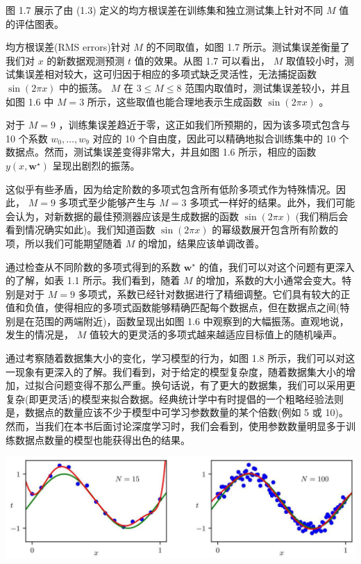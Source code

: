 \documentclass[10pt]{report}
\begin{document}
图 1.7 展示了由 (1.3) 定义的均方根误差在训练集和独立测试集上针对不同 \(M\) 值的评估图表。

均方根误差(RMS errors)针对 \(M\) 的不同取值，如图 1.7 所示。测试集误差衡量了我们对 \(x\) 的新数据观测预测 \(t\) 值的效果。从图 1.7 可以看出， \(M\) 取值较小时，测试集误差相对较大，这可归因于相应的多项式缺乏灵活性，无法捕捉函数 \(\sin \left( {2\pi x}\right)\) 中的振荡。 \(M\) 在 \(3 \leq  M \leq  8\) 范围内取值时，测试集误差较小，并且如图 1.6 中 \(M = 3\) 所示，这些取值也能合理地表示生成函数 \(\sin \left( {2\pi x}\right)\) 。

对于 \(M = 9\) ，训练集误差趋近于零，这正如我们所预期的，因为该多项式包含与 10 个系数 \({w}_{0},\ldots ,{w}_{9}\) 对应的 10 个自由度，因此可以精确地拟合训练集中的 10 个数据点。然而，测试集误差变得非常大，并且如图 1.6 所示，相应的函数 \(y\left( {x,{\mathbf{w}}^{ \star  }}\right)\) 呈现出剧烈的振荡。

这似乎有些矛盾，因为给定阶数的多项式包含所有低阶多项式作为特殊情况。因此， \(M = 9\) 多项式至少能够产生与 \(M = 3\) 多项式一样好的结果。此外，我们可能会认为，对新数据的最佳预测器应该是生成数据的函数 \(\sin \left( {2\pi x}\right)\) (我们稍后会看到情况确实如此)。我们知道函数 \(\sin \left( {2\pi x}\right)\) 的幂级数展开包含所有阶数的项，所以我们可能期望随着 \(M\) 的增加，结果应该单调改善。

通过检查从不同阶数的多项式得到的系数 \({\mathbf{w}}^{ \star  }\) 的值，我们可以对这个问题有更深入的了解，如表 1.1 所示。我们看到，随着 \(M\) 的增加，系数的大小通常会变大。特别是对于 \(M = 9\) 多项式，系数已经针对数据进行了精细调整。它们具有较大的正值和负值，使得相应的多项式函数能够精确匹配每个数据点，但在数据点之间(特别是在范围的两端附近)，函数呈现出如图 1.6 中观察到的大幅振荡。直观地说，发生的情况是， \(M\) 值较大的更灵活的多项式越来越适应目标值上的随机噪声。

通过考察随着数据集大小的变化，学习模型的行为，如图 1.8 所示，我们可以对这一现象有更深入的了解。我们看到，对于给定的模型复杂度，随着数据集大小的增加，过拟合问题变得不那么严重。换句话说，有了更大的数据集，我们可以采用更复杂(即更灵活)的模型来拟合数据。经典统计学中有时提倡的一个粗略经验法则是，数据点的数量应该不少于模型中可学习参数数量的某个倍数(例如 5 或 10)。然而，当我们在本书后面讨论深度学习时，我们会看到，使用参数数量明显多于训练数据点数量的模型也能获得出色的结果。

\begin{center}
\includegraphics[max width=1.0\textwidth]{images/0194e279-9b28-703a-88f4-c3ac21e2010d_31_240_344_1311_382_0.jpg}
\end{center}
\hspace*{3em} 
\end{document}
